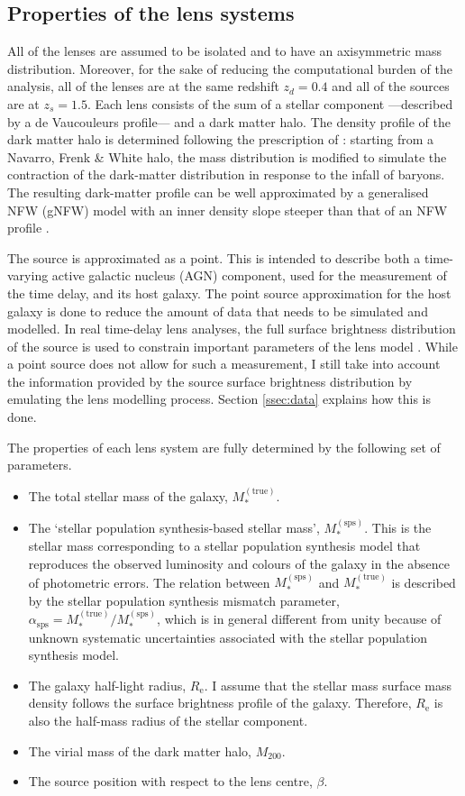 \documentclass{aa}
\def\mstartrue{M_*^{\mathrm{(true)}}}
\def\msps{M_*^{\mathrm{(sps)}}}
\def\asps{\alpha_{\mathrm{sps}}}
\def\mhalo{M_{200}}
\def\reff{R_{\mathrm{e}}}
\begin{document}
\subsection{Properties of the lens systems}\label{ssec:simprop}

All of the lenses are assumed to be isolated and to have an axisymmetric mass distribution.
Moreover, for the sake of reducing the computational burden of the analysis, all of the lenses are at the same redshift $z_d=0.4$ and all of the sources are at $z_s=1.5$.
Each lens consists of the sum of a stellar component ---described by a de Vaucouleurs profile--- and a dark matter halo. The density profile of the dark matter halo is determined following the prescription of \citet{Cautun2020}: starting from a Navarro, Frenk \& White \citep[NFW][]{NFW97} halo, the mass distribution is modified to simulate the contraction of the dark-matter distribution in response to the infall of baryons. The resulting dark-matter profile can be well approximated by a generalised NFW (gNFW) model with an inner density slope steeper than that of an NFW profile .

The source is approximated as a point. This is intended to describe both a time-varying active galactic nucleus (AGN) component, used for the measurement of the time delay, and its host galaxy. The point source approximation for the host galaxy is done to reduce the amount of data that needs to be simulated and modelled. In real time-delay lens analyses, the full surface brightness distribution of the source is used to constrain important parameters of the lens model \citep[see e.g.][]{Suy++13,Din++21}.
While a point source does not allow for such a measurement, I still take into account the information provided by the source surface brightness distribution by emulating the lens modelling process. Section \ref{ssec:data} explains how this is done.

The properties of each lens system are fully determined by the following set of parameters.
\begin{itemize}
\item The total stellar mass of the galaxy, $\mstartrue$.
\item The `stellar population synthesis-based stellar mass', $\msps$. This is the stellar mass corresponding to a stellar population synthesis model that reproduces the observed luminosity and colours of the galaxy in the absence of photometric errors. The relation between $\msps$ and $\mstartrue$ is described by the stellar population synthesis mismatch parameter, $\asps=\mstartrue/\msps$, which is in general different from unity because of unknown systematic uncertainties associated with the stellar population synthesis model. 
\item The galaxy half-light radius, $\reff$. I assume that the stellar mass surface mass density follows the surface brightness profile of the galaxy. Therefore, $\reff$ is also the half-mass radius of the stellar component.
\item The virial mass of the dark matter halo, $\mhalo$.
\item The source position with respect to the lens centre, $\beta$.
\end{itemize}
\end{document}
